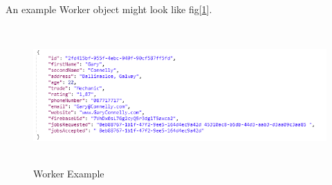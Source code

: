 \bigskip

An example Worker object might look like fig[\ref{fig:workerExample}].
\begin{figure}[H]
    \centering
    \includegraphics[width=\textwidth, height=150pt]{DesignImages/WorkerObject.PNG}
    \caption{Worker Example}
    \label{fig:workerExample}
\end{figure}

\bigskip

